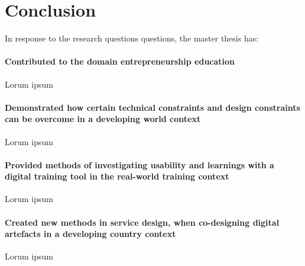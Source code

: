 \chapter{Conclusion}\label{cha:conclusion}


In response to the research questions questions, the master thesis has: %

\subsubsection{Contributed to the domain entrepreneurship education}
Lorum ipsum

\subsubsection{Demonstrated how certain technical constraints and design constraints can be overcome in a developing world context} %
Lorum ipsum

\subsubsection{Provided methods of investigating usability and learnings with a digital training tool in the real-world training context} %
Lorum ipsum

\subsubsection{Created new methods in service design, when co-designing digital artefacts in a developing country context}
Lorum ipsum
